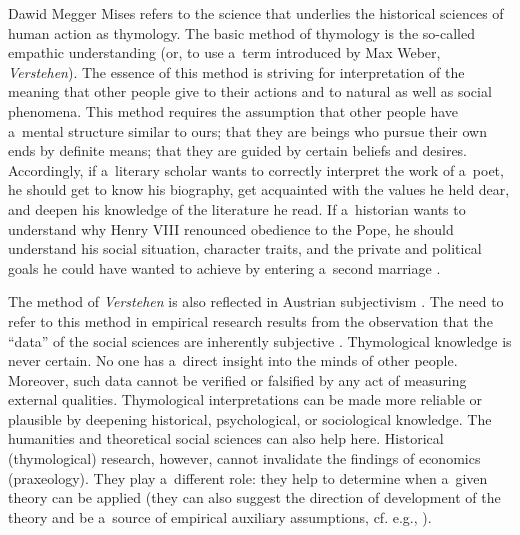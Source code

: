 \begin{artengenv}{Dawid Megger}
Mises refers to the science that underlies the historical sciences of human action as thymology. The basic method of thymology is the so-called empathic understanding (or, to use a~term introduced by Max Weber, \textit{Verstehen}). The essence of this method is striving for interpretation of the meaning that other people give to their actions and to natural as well as social phenomena. This method requires the assumption that other people have a~mental structure similar to ours; that they are beings who pursue their own ends by definite means; that they are guided by certain beliefs and desires. Accordingly, if a~literary scholar wants to correctly interpret the work of a~poet, he should get to know his biography, get acquainted with the values he held dear, and deepen his knowledge of the literature he read. If a~historian wants to understand why Henry VIII renounced obedience to the Pope, he should understand his social situation, character traits, and the private and political goals he could have wanted to achieve by entering a~second marriage 
\parencite[][pp.264–284]{mises_theory_2007}.%




The method of \textit{Verstehen} is also reflected in Austrian subjectivism 
\parencite[][]{lachmann_legacy_1971}. %
 The need to refer to this method in empirical research results from the observation that the ``data'' of the social sciences are inherently subjective 
\parencite[][]{hayek_counter-revolution_1952}.%
Thymological knowledge is never certain. No one has a~direct insight into the minds of other people. Moreover, such data cannot be verified or falsified by any act of measuring external qualities. Thymological interpretations can be made more reliable or plausible by deepening historical, psychological, or sociological knowledge. The humanities and theoretical social sciences can also help here. Historical (thymological) research, however, cannot invalidate the findings of economics (praxeology). They play a~different role: they help to determine when a~given theory can be applied (they can also suggest the direction of development of the theory and be a~source of empirical auxiliary assumptions, cf. e.g., 
\parencite[][]{wisniewski_methodology_2014}%
).




\end{artengenv}
